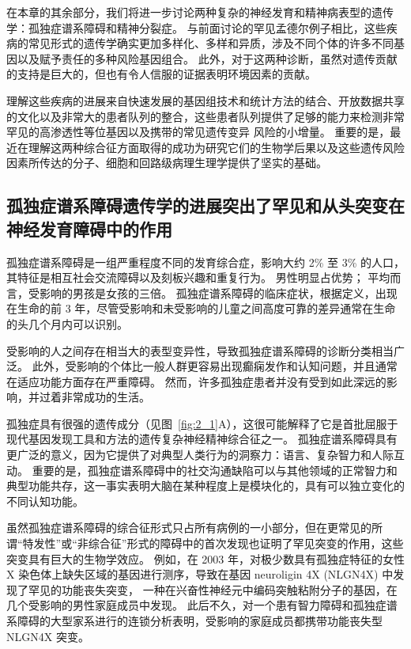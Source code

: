 在本章的其余部分，我们将进一步讨论两种复杂的神经发育和精神病表型的遗传学：孤独症谱系障碍和精神分裂症。
与前面讨论的罕见孟德尔例子相比，这些疾病的常见形式的遗传学确实更加多样化、多样和异质，涉及不同个体的许多不同基因以及赋予责任的多种风险基因组合。
此外，对于这两种诊断，虽然对遗传贡献的支持是巨大的，但也有令人信服的证据表明环境因素的贡献。


理解这些疾病的进展来自快速发展的基因组技术和统计方法的结合、开放数据共享的文化以及非常大的患者队列的整合，这些患者队列提供了足够的能力来检测非常罕见的高渗透性等位基因以及携带的常见遗传变异 风险的小增量。
重要的是，最近在理解这两种综合征方面取得的成功为研究它们的生物学后果以及这些遗传风险因素所传达的分子、细胞和回路级病理生理学提供了坚实的基础。



\subsection{孤独症谱系障碍遗传学的进展突出了罕见和从头突变在神经发育障碍中的作用}

孤独症谱系障碍是一组严重程度不同的发育综合症，影响大约 2\% 至 3\% 的人口，其特征是相互社会交流障碍以及刻板兴趣和重复行为。
男性明显占优势；
平均而言，受影响的男孩是女孩的三倍。
孤独症谱系障碍的临床症状，根据定义，出现在生命的前 3 年，尽管受影响和未受影响的儿童之间高度可靠的差异通常在生命的头几个月内可以识别。


受影响的人之间存在相当大的表型变异性，导致孤独症谱系障碍的诊断分类相当广泛。
此外，受影响的个体比一般人群更容易出现癫痫发作和认知问题，并且通常在适应功能方面存在严重障碍。
然而，许多孤独症患者并没有受到如此深远的影响，并过着非常成功的生活。


孤独症具有很强的遗传成分（见图~\ref{fig:2_1}A），这很可能解释了它是首批屈服于现代基因发现工具和方法的遗传复杂神经精神综合征之一。
孤独症谱系障碍具有更广泛的意义，因为它提供了对典型人类行为的洞察力：语言、复杂智力和人际互动。
重要的是，孤独症谱系障碍中的社交沟通缺陷可以与其他领域的正常智力和典型功能共存，这一事实表明大脑在某种程度上是模块化的，具有可以独立变化的不同认知功能。


虽然孤独症谱系障碍的综合征形式只占所有病例的一小部分，但在更常见的所谓“特发性”或“非综合征”形式的障碍中的首次发现也证明了罕见突变的作用，这些突变具有巨大的生物学效应。
例如，在 2003 年，对极少数具有孤独症特征的女性 X 染色体上缺失区域的基因进行测序，导致在基因 neuroligin 4X (NLGN4X) 中发现了罕见的功能丧失突变， 一种在兴奋性神经元中编码突触粘附分子的基因，在几个受影响的男性家庭成员中发现。
此后不久，对一个患有智力障碍和孤独症谱系障碍的大型家系进行的连锁分析表明，受影响的家庭成员都携带功能丧失型 NLGN4X 突变。


